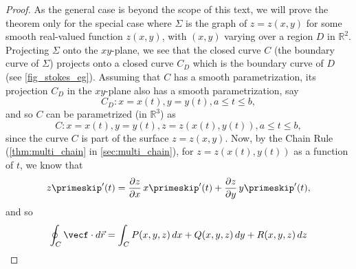 \begin{proof}
 As the general case is beyond the scope of this text, we will prove the theorem only for the special case where $\Sigma$ is the graph of $z=z(x,y)$ for some smooth real-valued function $z(x,y)$, with $(x,y)$ varying over a region $D$ in $\mathbb{R}^{2}$. 
 Projecting $\Sigma$ onto the $xy$-plane, we see that the closed curve $C$ (the boundary curve of $\Sigma$) projects onto a closed curve $C_D$ which is the boundary curve of $D$ (see \autoref{fig_stokes_eg}). Assuming that $C$ has a smooth parametrization, its projection $C_D$ in the $xy$-plane also has a smooth parametrization, say
 \[C_D: x=x(t), y=y(t), a \le t \le b ,\]
 and so $C$ can be parametrized (in $\mathbb{R}^{3}$) as
 \[C: x=x(t), y=y(t), z=z(x(t),y(t)),a \le t \le b ,\]
 since the curve $C$ is part of the surface $z=z(x,y)$. Now, by the Chain Rule (\autoref{thm:multi_chain} in \autoref{sec:multi_chain}), for $z=z(x(t),y(t))$ as a function of $t$, we know that
 \[
  z\primeskip'(t) = \frac{\partial z}{\partial x}\,x\primeskip'(t) + \frac{\partial z}{\partial y}\,y\primeskip'(t) ,
 \]
 and so
 \begin{align*}
  \oint_C\vecf\cdot d\vec{r} &= \int_C P(x,y,z)\,dx + Q(x,y,z)\,dy + R(x,y,z)\,dz\\

\end{align*}
\end{proof}
